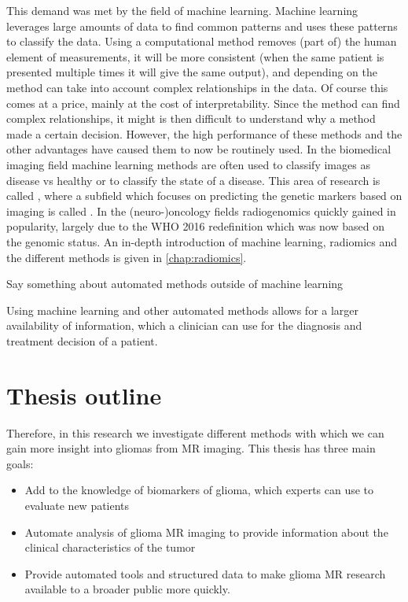 This demand was met by the field of machine learning.
Machine learning leverages large amounts of data to find common patterns and uses these patterns to classify the data.
Using a computational method removes (part of) the human element of measurements, it will be more consistent (when the same patient is presented multiple times it will give the same output), and depending on the method can take into account complex relationships in the data.
Of course this comes at a price, mainly at the cost of interpretability.
Since the method can find complex relationships, it might is then difficult to understand why a method made a certain decision.
However, the high performance of these methods and the other advantages have caused them to now be routinely used.
In the biomedical imaging field machine learning methods are often used to classify images as disease vs healthy or to classify the state of a disease.
This area of research is called , where a subfield which focuses on predicting the genetic markers based on imaging is called .
In the (neuro-)oncology fields radiogenomics quickly gained in popularity, largely due to the WHO 2016 redefinition which was now based on the genomic status.
An in-depth introduction of machine learning, radiomics and the different methods is given in \cref{chap:radiomics}.


Say something about automated methods outside of machine learning


Using machine learning and other automated methods allows for a larger availability of information, which a clinician can use for the diagnosis and treatment decision of a patient.

\section{Thesis outline}
Therefore, in this research we investigate different methods with which we can gain more insight into gliomas from MR imaging. This thesis has three main goals:
\begin{itemize}
\item Add to the knowledge of biomarkers of glioma, which experts can use to evaluate new patients
\item Automate analysis of glioma MR imaging to provide information about the clinical characteristics of the tumor
\item Provide automated tools and structured data to make glioma MR research available to a broader public more quickly.
\end{itemize}

